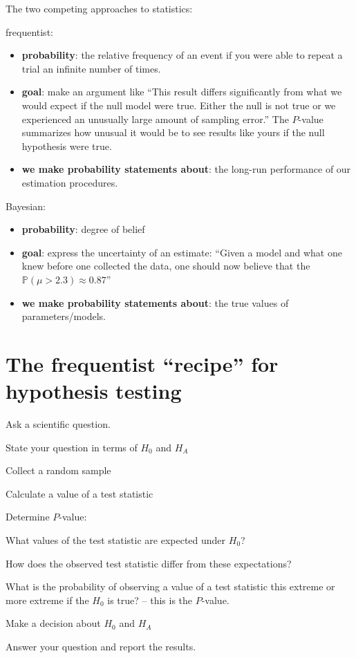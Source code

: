 \documentclass[landscape]{foils}
\renewcommand{\Pr}{\mathbb{P}}
\begin{document}
\myNewSlide
The two competing approaches to statistics:
\begin{compactitem}
  \item frequentist:
  \begin{itemize}
    \item {\bf probability}: the relative frequency of an event if you were able to repeat a trial an infinite number of times.
    \item {\bf goal}: make an argument like ``This result differs significantly from what we would expect if the null model were true. Either the null is not true or we experienced an unusually large amount of sampling error.''
    The $P$-value summarizes how unusual it would be to see results like yours if the null hypothesis were true.
    \item {\bf we make probability statements about}: the long-run performance of our estimation procedures.
  \end{itemize}
  \item Bayesian:
  \begin{itemize}
    \item {\bf probability}: degree of belief
    \item {\bf goal}: express the uncertainty of an estimate:
    ``Given a model and what one knew before one collected the data, one should now believe that the $\Pr(\mu>2.3)\approx 0.87$''
    \item {\bf we make probability statements about}: the true values of parameters/models.
  \end{itemize}
\end{compactitem}

\myNewSlide
\section*{The frequentist ``recipe'' for hypothesis testing}
\begin{compactenum}
  \item Ask a scientific question.
  \item State your question in terms of $H_0$ and $H_A$
  \item Collect a random sample
  \item Calculate a value of a test statistic
  \item Determine $P$-value:
  \begin{compactenum}
    \item What values of the test statistic are expected under $H_0$?
    \item How does the observed test statistic differ from these expectations?
    \item What is the probability of observing a value of a test statistic this extreme or more extreme if the $H_0$ is true? -- this is the $P$-value.
  \end{compactenum}
  \item Make a decision about $H_0$ and $H_A$
  \item Answer your question and report the results.
\end{compactenum}
\end{document}
